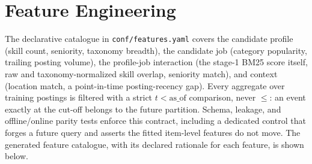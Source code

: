 \section{Feature Engineering}
The declarative catalogue in \texttt{conf/features.yaml} covers the
candidate profile (skill count, seniority, taxonomy breadth), the candidate
job (category popularity, trailing posting volume), the profile-job
interaction (the stage-1 BM25 score itself, raw and taxonomy-normalized
skill overlap, seniority match), and context (location match, a
point-in-time posting-recency gap). Every aggregate over training postings
is filtered with a strict $t<\text{as\_of}$ comparison, never $\le$: an
event exactly at the cut-off belongs to the future partition. Schema,
leakage, and offline/online parity tests enforce this contract, including
a dedicated control that forges a future query and asserts the fitted
item-level features do not move. The generated feature catalogue, with its
declared rationale for each feature, is shown below.
\scriptsize\normalsize
